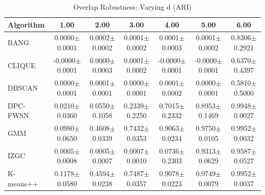 \begin{table}[ht!]
\centering
\caption{Overlap Robustness: Varying d (ARI)}
\label{tab:overlap_vary_d}
\begin{tabular*}{\linewidth}{@{} lcccccc @{}}
\toprule
Algorithm & 1.00 & 2.00 & 3.00 & 4.00 & 5.00 & 6.00 \\
\midrule
BANG & 0.0000$\pm$0.0001 & 0.0002$\pm$0.0002 & 0.0001$\pm$0.0002 & 0.0001$\pm$0.0003 & 0.0001$\pm$0.0002 & 0.8306$\pm$0.2921 \\
CLIQUE & -0.0000$\pm$0.0001 & 0.0000$\pm$0.0003 & 0.0001$\pm$0.0002 & -0.0000$\pm$0.0001 & -0.0000$\pm$0.0001 & 0.6370$\pm$0.4397 \\
DBSCAN & 0.0000$\pm$0.0001 & 0.0001$\pm$0.0001 & 0.0000$\pm$0.0001 & 0.0001$\pm$0.0002 & 0.0000$\pm$0.0001 & 0.5810$\pm$0.5000 \\
DPC-FWSN & 0.0210$\pm$0.0360 & 0.0550$\pm$0.1058 & 0.2339$\pm$0.2250 & 0.7015$\pm$0.2332 & 0.8953$\pm$0.1469 & 0.9948$\pm$0.0027 \\
GMM & 0.0980$\pm$0.0650 & 0.4608$\pm$0.0339 & 0.7432$\pm$0.0353 & 0.9063$\pm$0.0234 & 0.9750$\pm$0.0105 & 0.9952$\pm$0.0032 \\
IZGC & 0.0005$\pm$0.0008 & 0.0005$\pm$0.0007 & 0.0007$\pm$0.0010 & 0.0736$\pm$0.2303 & 0.9313$\pm$0.0629 & 0.9587$\pm$0.0527 \\
K-means++ & 0.1178$\pm$0.0580 & 0.4594$\pm$0.0238 & 0.7487$\pm$0.0357 & 0.9078$\pm$0.0223 & 0.9749$\pm$0.0079 & 0.9952$\pm$0.0037 \\
\bottomrule
\end{tabular*}
\end{table}
